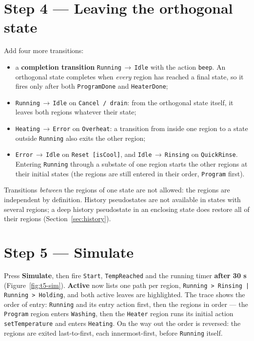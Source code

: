 \documentclass[11pt,a4paper,openany]{report}
\newcommand{\ui}[1]{\textsf{\textbf{#1}}}
\newcommand{\code}[1]{\texttt{#1}}
\begin{document}
\section{Step 4 --- Leaving the orthogonal state}
Add four more transitions:
\begin{itemize}[itemsep=1pt]
  \item a \textbf{completion transition} \code{Running}\,$\rightarrow$\,\code{Idle} with the action
        \code{beep}. An orthogonal state completes when \emph{every} region has reached a final state,
        so it fires only after both \code{ProgramDone} and \code{HeaterDone};
  \item \code{Running}\,$\rightarrow$\,\code{Idle} on \code{Cancel / drain}: from the orthogonal state
        itself, it leaves both regions whatever their state;
  \item \code{Heating}\,$\rightarrow$\,\code{Error} on \code{Overheat}: a transition from inside one
        region to a state outside \code{Running} also exits the other region;
  \item \code{Error}\,$\rightarrow$\,\code{Idle} on \code{Reset [isCool]}, and
        \code{Idle}\,$\rightarrow$\,\code{Rinsing} on \code{QuickRinse}. Entering \code{Running}
        through a substate of one region starts the other regions at their initial states (the
        regions are still entered in their order, \code{Program} first).
\end{itemize}
Transitions \emph{between} the regions of one state are not allowed: the regions are independent by
definition. History pseudostates are not available in states with several regions; a deep history
pseudostate in an enclosing state does restore all of their regions (Section~\ref{sec:history}).

\section{Step 5 --- Simulate}
Press \ui{Simulate}, then fire \code{Start}, \code{TempReached} and the running timer
\ui{after 30 s} (Figure~\ref{fig:t5-sim}). \ui{Active} now lists one path per region,
\code{Running > Rinsing | Running > Holding}, and both active leaves are highlighted. The trace shows
the order of entry: \code{Running} and its entry action first, then the regions in order --- the
\code{Program} region enters \code{Washing}, then the \code{Heater} region runs its initial action
\code{setTemperature} and enters \code{Heating}. On the way out the order is reversed: the regions
are exited last-to-first, each innermost-first, before \code{Running} itself.
\end{document}
